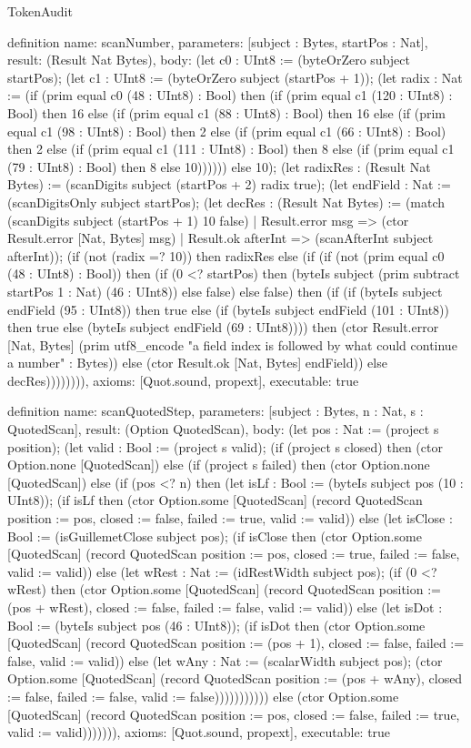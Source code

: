 \begin{lexlean}{TokenAudit}
\begin{semanticmodule}
definition{
  name: scanNumber,
  parameters: [subject : Bytes, startPos : Nat],
  result: (Result Nat Bytes),
  body: (let c0 : UInt8 := (byteOrZero subject startPos); (let c1 : UInt8 := (byteOrZero subject (startPos + 1)); (let radix : Nat := (if (prim equal c0 (48 : UInt8) : Bool) then (if (prim equal c1 (120 : UInt8) : Bool) then 16 else (if (prim equal c1 (88 : UInt8) : Bool) then 16 else (if (prim equal c1 (98 : UInt8) : Bool) then 2 else (if (prim equal c1 (66 : UInt8) : Bool) then 2 else (if (prim equal c1 (111 : UInt8) : Bool) then 8 else (if (prim equal c1 (79 : UInt8) : Bool) then 8 else 10)))))) else 10); (let radixRes : (Result Nat Bytes) := (scanDigits subject (startPos + 2) radix true); (let endField : Nat := (scanDigitsOnly subject startPos); (let decRes : (Result Nat Bytes) := (match (scanDigits subject (startPos + 1) 10 false)
    | Result.error msg => (ctor Result.error [Nat, Bytes] msg)
    | Result.ok afterInt => (scanAfterInt subject afterInt)); (if (not (radix =? 10)) then radixRes else (if (if (not (prim equal c0 (48 : UInt8) : Bool)) then (if (0 <? startPos) then (byteIs subject (prim subtract startPos 1 : Nat) (46 : UInt8)) else false) else false) then (if (if (byteIs subject endField (95 : UInt8)) then true else (if (byteIs subject endField (101 : UInt8)) then true else (byteIs subject endField (69 : UInt8)))) then (ctor Result.error [Nat, Bytes] (prim utf8_encode "a field index is followed by what could continue a number" : Bytes)) else (ctor Result.ok [Nat, Bytes] endField)) else decRes)))))))),
  axioms: [Quot.sound, propext],
  executable: true
}

definition{
  name: scanQuotedStep,
  parameters: [subject : Bytes, n : Nat, s : QuotedScan],
  result: (Option QuotedScan),
  body: (let pos : Nat := (project s position); (let valid : Bool := (project s valid); (if (project s closed) then (ctor Option.none [QuotedScan]) else (if (project s failed) then (ctor Option.none [QuotedScan]) else (if (pos <? n) then (let isLf : Bool := (byteIs subject pos (10 : UInt8)); (if isLf then (ctor Option.some [QuotedScan] (record QuotedScan {position := pos, closed := false, failed := true, valid := valid})) else (let isClose : Bool := (isGuillemetClose subject pos); (if isClose then (ctor Option.some [QuotedScan] (record QuotedScan {position := pos, closed := true, failed := false, valid := valid})) else (let wRest : Nat := (idRestWidth subject pos); (if (0 <? wRest) then (ctor Option.some [QuotedScan] (record QuotedScan {position := (pos + wRest), closed := false, failed := false, valid := valid})) else (let isDot : Bool := (byteIs subject pos (46 : UInt8)); (if isDot then (ctor Option.some [QuotedScan] (record QuotedScan {position := (pos + 1), closed := false, failed := false, valid := valid})) else (let wAny : Nat := (scalarWidth subject pos); (ctor Option.some [QuotedScan] (record QuotedScan {position := (pos + wAny), closed := false, failed := false, valid := false}))))))))))) else (ctor Option.some [QuotedScan] (record QuotedScan {position := pos, closed := false, failed := true, valid := valid}))))))),
  axioms: [Quot.sound, propext],
  executable: true
}


\end{semanticmodule}
\end{lexlean}
